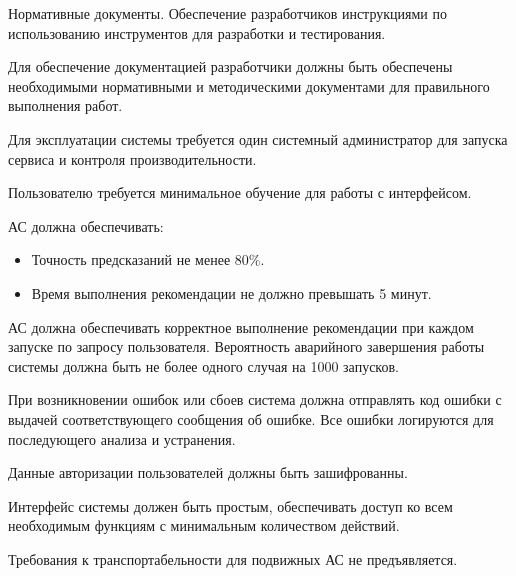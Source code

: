 Нормативные документы.
Обеспечение разработчиков инструкциями по использованию инструментов
для разработки и тестирования.


Для обеспечение документацией разработчики
должны быть обеспечены необходимыми нормативными
и методическими документами для правильного выполнения работ.



Для эксплуатации системы требуется один системный администратор
для запуска сервиса и контроля производительности.

Пользователю требуется минимальное обучение для работы с интерфейсом.


АС должна обеспечивать:

\begin{itemize}
	\item Точность предсказаний не менее 80\%.
	\item Время выполнения рекомендации не должно превышать 5 минут.
\end{itemize}


АС должна обеспечивать корректное выполнение рекомендации
при каждом запуске по запросу пользователя.
Вероятность аварийного завершения работы системы должна быть
не более одного случая на 1000 запусков.

При возникновении ошибок или сбоев система должна отправлять код ошибки
с выдачей соответствующего сообщения об ошибке.
Все ошибки логируются для последующего анализа и устранения.


Данные авторизации пользователей должны быть зашифрованны.


Интерфейс системы должен быть простым,
обеспечивать доступ ко всем необходимым функциям
с минимальным количеством действий.


Требования к транспортабельности для подвижных АС
не предъявляется.

